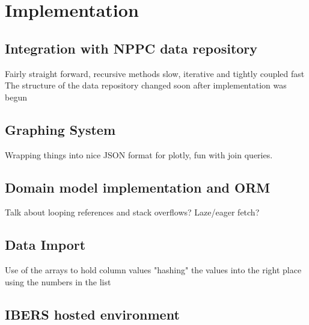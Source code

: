 \chapter{Implementation}



\section{Integration with NPPC data repository}
Fairly straight forward, recursive methods slow, iterative and tightly coupled fast
The structure of the data repository changed soon after implementation was begun
\section{Graphing System}
Wrapping things into nice JSON format for plotly, fun with join queries.

\section{Domain model implementation and ORM}
Talk about looping references and stack overflows? Laze/eager fetch? 

\section{Data Import}
Use of the arrays to hold column values "hashing" the values into the right place using the numbers in the list

\section{IBERS hosted environment}

